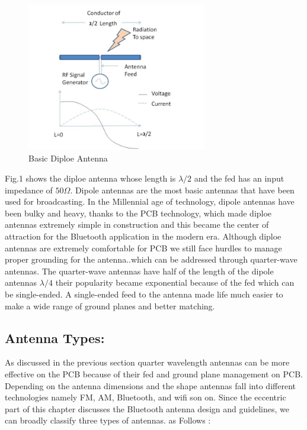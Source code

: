 \begin{figure}[h]
	\centering
	\includegraphics[width=0.7\textwidth]{Chap03/Figures/Basic_Antenna.PNG}
	\caption{Basic Diploe Antenna}
	\label{BASIC_ANTENNA}
\end{figure}

Fig.1  shows the diploe antenna whose length is  $\lambda/2$ and the fed has an input impedance of $50\Omega $.
Dipole antennas are the most basic antennas that have been used for broadcasting.
In the Millennial age of technology, dipole antennas have been bulky and heavy, thanks to the PCB technology, which made diploe antennas extremely simple in construction and this became the center of attraction for the Bluetooth application in the modern era.
Although diploe antennas are extremely comfortable for PCB we still face hurdles to manage proper grounding for the antenna..which can be addressed through quarter-wave antennas.
The quarter-wave antennas have half of the length of the dipole antennas  $\lambda/4$ their popularity became exponential because of the fed which can be single-ended.
A single-ended feed to the antenna made life much easier to make a wide range of ground planes and better matching.

\subsection{Antenna Types:}

As discussed in the previous section quarter wavelength antennas can be more effective on the PCB because of their fed and ground plane management on PCB.
Depending on the antenna dimensions and the shape antennas fall into different technologies namely FM, AM, Bluetooth, and wifi son on.
Since the eccentric part of this chapter discusses the Bluetooth antenna design and guidelines, we can broadly classify three types of antennas. as Follows :

